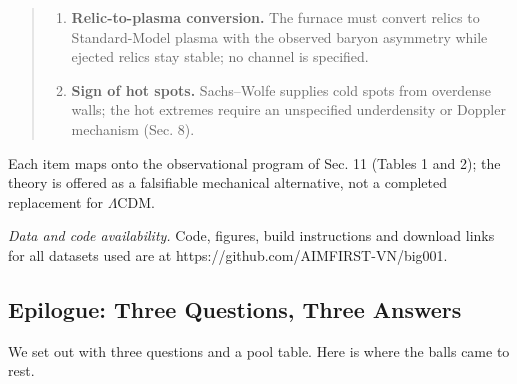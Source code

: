 \documentclass[
]{article}
\begin{document}
\begin{quote}
\begin{enumerate}
  \(\sim\!10^{20}\,\ell_P\) patch must be assumed (the horizon problem
  stands). Ejection proceeds where Newtonian escape velocity vastly
  exceeds \(c\); the \(N\)-body mechanism lacks a relativistic
  formulation, prerequisite for H1 to be a physical theory rather than
  an analogy. The neighbour of H3/H6 lies beyond the particle horizon,
  so its imprint must be an initial-condition potential (Sec. 7); how
  such a potential is laid down across a domain boundary is not
  modelled.
\item
  \textbf{Relic-to-plasma conversion.} The furnace must convert relics
  to Standard-Model plasma with the observed baryon asymmetry while
  ejected relics stay stable; no channel is specified.
\item
  \textbf{Sign of hot spots.} Sachs--Wolfe supplies cold spots from
  overdense walls; the hot extremes require an unspecified underdensity
  or Doppler mechanism (Sec. 8).
\end{enumerate}
\end{quote}

Each item maps onto the observational program of Sec. 11 (Tables 1 and
2); the theory is offered as a falsifiable mechanical alternative, not a
completed replacement for \(\Lambda\)CDM.

\emph{Data and code availability.} Code, figures, build instructions and
download links for all datasets used are at
https://github.com/AIMFIRST-VN/big001.

\hypertarget{epilogue-three-questions-three-answers}{%
\subsection{\texorpdfstring{\textbf{Epilogue: Three Questions, Three
Answers}}{Epilogue: Three Questions, Three Answers}}\label{epilogue-three-questions-three-answers}}

We set out with three questions and a pool table. Here is where the
balls came to rest.
\end{document}
